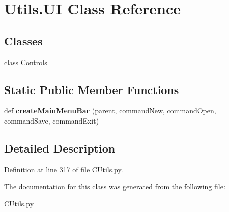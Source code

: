 \hypertarget{class_c_utils_1_1_utils_1_1_u_i}{}\section{Utils.\+UI Class Reference}
\label{class_c_utils_1_1_utils_1_1_u_i}
\subsection*{Classes}
\begin{DoxyCompactItemize}
\item 
class \hyperlink{class_c_utils_1_1_utils_1_1_u_i_1_1_controls}{Controls}
\end{DoxyCompactItemize}
\subsection*{Static Public Member Functions}
\begin{DoxyCompactItemize}
\item 
\mbox{\label{class_c_utils_1_1_utils_1_1_u_i_a309d2769160d410d0e5a636c9d2bc814}} 
def {\bfseries create\+Main\+Menu\+Bar} (parent, command\+New, command\+Open, command\+Save, command\+Exit)
\end{DoxyCompactItemize}


\subsection{Detailed Description}


Definition at line 317 of file C\+Utils.\+py.



The documentation for this class was generated from the following file\+:\begin{DoxyCompactItemize}
\item 
C\+Utils.\+py\end{DoxyCompactItemize}
